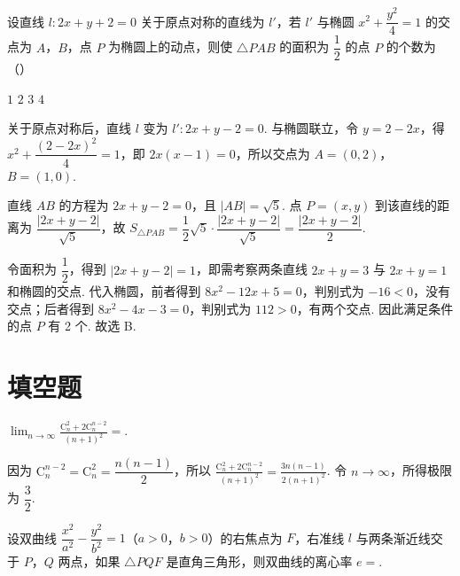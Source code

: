 \begin{problem}
设直线 \(l\colon 2x+y+2=0\) 关于原点对称的直线为 \(l'\)，若 \(l'\) 与椭圆 \(x^2+\dfrac{y^2}{4}=1\) 的交点为 \(A\)，\(B\)，点 \(P\) 为椭圆上的动点，则使 \(\triangle PAB\) 的面积为 \(\dfrac{1}{2}\) 的点 \(P\) 的个数为（\quad）

\choices
    {\(1\)}
    {\(2\)}
    {\(3\)}
    {\(4\)}
\end{problem}

\begin{solution}
关于原点对称后，直线 \(l\) 变为 \(l'\colon 2x+y-2=0\). 与椭圆联立，令 \(y=2-2x\)，得
\(x^2+\dfrac{(2-2x)^2}{4}=1\)，即 \(2x(x-1)=0\)，所以交点为 \(A=(0,2)\)，\(B=(1,0)\).

直线 \(AB\) 的方程为 \(2x+y-2=0\)，且 \(|AB|=\sqrt{5}\). 点 \(P=(x,y)\) 到该直线的距离为 \(\dfrac{|2x+y-2|}{\sqrt{5}}\)，故
\(S_{\triangle PAB}=\dfrac{1}{2}\sqrt{5}\cdot\dfrac{|2x+y-2|}{\sqrt{5}}=\dfrac{|2x+y-2|}{2}\).

令面积为 \(\dfrac{1}{2}\)，得到 \(|2x+y-2|=1\)，即需考察两条直线 \(2x+y=3\) 与 \(2x+y=1\) 和椭圆的交点. 代入椭圆，前者得到 \(8x^2-12x+5=0\)，判别式为 \(-16<0\)，没有交点；后者得到 \(8x^2-4x-3=0\)，判别式为 \(112>0\)，有两个交点. 因此满足条件的点 \(P\) 有 2 个. 故选 B.
\end{solution}

\section{填空题}
\begin{problem}
\(\displaystyle\lim_{n\to \infty}\frac{\mathrm C_n^2+2\mathrm C_n^{n-2}}{(n+1)^2}=\)\fillinblank{}.
\end{problem}

\begin{solution}
因为 \(\mathrm C_n^{n-2}=\mathrm C_n^2=\dfrac{n(n-1)}{2}\)，所以
\(\displaystyle\frac{\mathrm C_n^2+2\mathrm C_n^{n-2}}{(n+1)^2}=\frac{3n(n-1)}{2(n+1)^2}\). 令 \(n\to\infty\)，所得极限为 \(\dfrac{3}{2}\).
\end{solution}

\begin{problem}
设双曲线 \(\dfrac{x^{2}}{a^{2}}-\dfrac{y^{2}}{b^{2}}=1\)（\(a>0\)，\(b>0\)）的右焦点为 \(F\)，右准线 \(l\) 与两条渐近线交于 \(P\)，\(Q\) 两点，如果 \(\triangle PQF\) 是直角三角形，则双曲线的离心率 \(e=\)\fillinblank{}.
\end{problem}

